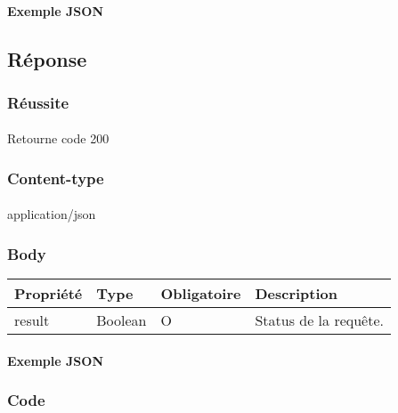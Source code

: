 		\paragraph{Exemple JSON}
			\paragraph{}
			

\subsection{Réponse}
	\subsubsection{Réussite}
		\paragraph{}
			Retourne code 200
			
	\subsubsection{Content-type}
		\paragraph{}
			application/json
	
	\subsubsection{Body}
		\begin{center}
			\begin{tabularx}{\textwidth}{| T{0.2122\textwidth} | S{0.22\textwidth} | S{0.15\textwidth} | S{0.3\textwidth} |}
				\hline
				Propriété & Type & Obligatoire & Description \\
				\hline
				result & Boolean & O & Status de la requête. \\
				\hline
			\end{tabularx}
		\end{center}
		
		\vspace{\baselineskip}
		\paragraph{Exemple JSON}
			\paragraph{}
			
			
			
	\subsubsection{Code}
		\paragraph{}
